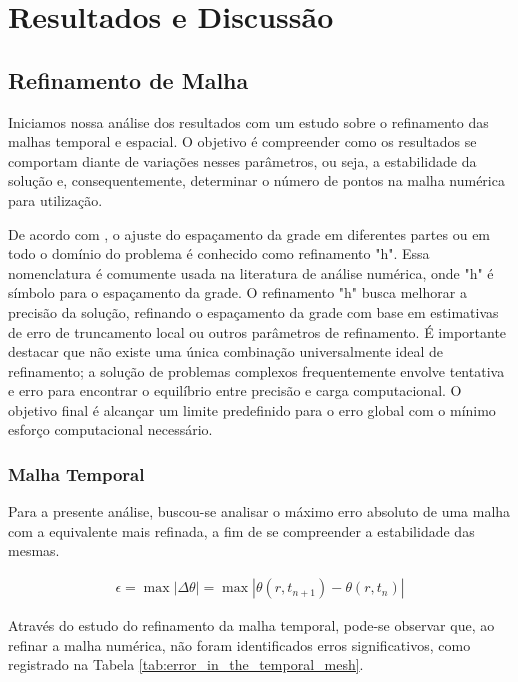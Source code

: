 \chapter{Resultados e Discussão} \label{chap:results}

\section{Refinamento de Malha}

Iniciamos nossa análise dos resultados com um estudo sobre o refinamento das malhas temporal e espacial. O objetivo é compreender como os resultados se comportam diante de variações nesses parâmetros, ou seja, a estabilidade da solução e, consequentemente, determinar o número de pontos na malha numérica para utilização.

De acordo com \citet{schiesser2009}, o ajuste do espaçamento da grade em diferentes partes ou em todo o domínio do problema é conhecido como refinamento "h". Essa nomenclatura é comumente usada na literatura de análise numérica, onde "h" é símbolo para o espaçamento da grade. O refinamento "h" busca melhorar a precisão da solução, refinando o espaçamento da grade com base em estimativas de erro de truncamento local ou outros parâmetros de refinamento. É importante destacar que não existe uma única combinação universalmente ideal de refinamento; a solução de problemas complexos frequentemente envolve tentativa e erro para encontrar o equilíbrio entre precisão e carga computacional. O objetivo final é alcançar um limite predefinido para o erro global com o mínimo esforço computacional necessário.

\subsection{Malha Temporal}

Para a presente análise, buscou-se analisar o máximo erro absoluto de uma malha com a equivalente mais refinada, a fim de se compreender a estabilidade das mesmas.

\begin{gather}
    \epsilon = \max | \Delta \theta | = \max | \theta(r,t_{n+1}) - \theta(r,t_{n}) |
\end{gather}

Através do estudo do refinamento da malha temporal, pode-se observar que, ao refinar a malha numérica, não foram identificados erros significativos, como registrado na Tabela \ref{tab:error_in_the_temporal_mesh}.

